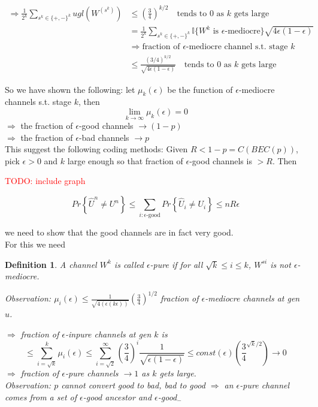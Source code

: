 \documentclass{article}
\newtheorem{definition}{Definition}[section]
\theoremstyle{definition} %
\newcommand{\todo}[1]{\textcolor{red}{TODO: #1}}
\renewcommand{\Pr}[1]{Pr\left\{#1\right\}}
\def\I{\mathbb{I}}
\begin{document}
\begin{align*}
  \Rightarrow \frac{1}{2^k} \sum_{s^k \in \{+, -\}^k} ugl(W^{(s^k)}) &\leq (\frac{3}{4})^{k/2} \quad \text{tends to 0 as } k \text{ gets large} \\
  &= \frac{1}{2^k} \sum_{s^k \in \{+, -\}^k} \I\{W^k \text{ is } \epsilon \text{-mediocre}\} \sqrt{4 \epsilon(1 - \epsilon)} \\
  & \Rightarrow \text{fraction of } \epsilon \text{-mediocre channel s.t. stage } k \\
  & \leq \frac{(3/4)^{k/2}}{\sqrt{4 \epsilon (1 - \epsilon)}}  \quad \text{tends to 0 as } k \text{ gets large}
\end{align*}

So we have shown the following: let $\mu_k(\epsilon)$ be the function of $\epsilon$-mediocre channels s.t. stage $k$, then
\[
  \lim_{k \to \infty} \mu_k(\epsilon) = 0
\]
$\Rightarrow$ the fraction of $\epsilon$-good channels $\rightarrow (1-p)$\\ 
$\Rightarrow$ the fraction of $\epsilon$-bad channels $\rightarrow p$ \\

This suggest the following coding methods: Given $R < 1 - p = C(BEC(p))$, pick $\epsilon > 0$ and $k$ large enough so that fraction of $\epsilon$-good channels is $>R$. Then 

\todo{include graph}

\[
  \Pr{\hat{U}^n \neq U^n} \leq \sum_{i: \epsilon\text{-good}} \Pr{\hat{U}_i \neq U_i} \leq nR \epsilon
\]

we need to show that the good channels are in fact very good.\\

For this we need

\begin{definition}
  A channel $W^k$ is called $\epsilon$-pure if for all $\sqrt{k} \leq i \leq k$, $W^{si}$ is not $\epsilon$-mediocre.

  \textit{Observation:} $\mu_i(\epsilon) \leq \frac{1}{\sqrt{4(\epsilon(k \epsilon))}}(\frac{3}{4})^{1/2}$ fraction of $\epsilon$-mediocre channels at gen $u$.

  $\Rightarrow$ fraction of $\epsilon$-inpure channels at gen $k$ is 
  \[ 
    \leq \sum_{i = \sqrt{k}}^k \mu_i(\epsilon) \leq \sum_{i = \sqrt{2}}^{\infty} (\frac{3}{4})^i \frac{1}{\sqrt{\epsilon(1 - \epsilon)}} \leq const (\epsilon)(\frac{3}{4}^{\sqrt{k}/2}) \rightarrow 0
  \]
  $\Rightarrow$ fraction of $\epsilon$-pure channels $\rightarrow 1$ as $k$ gets large.\\

  \textit{Observation:} $p$ cannot convert good to bad, bad to good $\Rightarrow$ an $\epsilon$-pure channel comes from a set of $\epsilon$-good ancestor and $\epsilon$-good$_-$
\end{definition}
\end{document}
